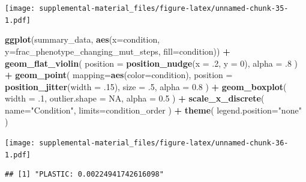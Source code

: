 \documentclass[]{book}
\newenvironment{Shaded}{\begin{snugshade}}{\end{snugshade}}
\newcommand{\DataTypeTok}[1]{\textcolor[rgb]{0.13,0.29,0.53}{#1}}
\newcommand{\DecValTok}[1]{\textcolor[rgb]{0.00,0.00,0.81}{#1}}
\newcommand{\FloatTok}[1]{\textcolor[rgb]{0.00,0.00,0.81}{#1}}
\newcommand{\KeywordTok}[1]{\textcolor[rgb]{0.13,0.29,0.53}{\textbf{#1}}}
\newcommand{\NormalTok}[1]{#1}
\newcommand{\OperatorTok}[1]{\textcolor[rgb]{0.81,0.36,0.00}{\textbf{#1}}}
\newcommand{\OtherTok}[1]{\textcolor[rgb]{0.56,0.35,0.01}{#1}}
\newcommand{\StringTok}[1]{\textcolor[rgb]{0.31,0.60,0.02}{#1}}
\begin{document}
\texttt{[image: supplemental-material\_files/figure-latex/unnamed-chunk-35-1.pdf]}

\begin{Shaded}
\begin{Highlighting}[]
\KeywordTok{ggplot}\NormalTok{(summary_data, }\KeywordTok{aes}\NormalTok{(}\DataTypeTok{x=}\NormalTok{condition, }\DataTypeTok{y=}\NormalTok{frac_phenotype_changing_mut_steps, }\DataTypeTok{fill=}\NormalTok{condition)) }\OperatorTok{+}
\StringTok{  }\KeywordTok{geom_flat_violin}\NormalTok{(}
    \DataTypeTok{position =} \KeywordTok{position_nudge}\NormalTok{(}\DataTypeTok{x =} \FloatTok{.2}\NormalTok{, }\DataTypeTok{y =} \DecValTok{0}\NormalTok{),}
    \DataTypeTok{alpha =} \FloatTok{.8}
\NormalTok{  ) }\OperatorTok{+}
\StringTok{  }\KeywordTok{geom_point}\NormalTok{(}
    \DataTypeTok{mapping=}\KeywordTok{aes}\NormalTok{(}\DataTypeTok{color=}\NormalTok{condition),}
    \DataTypeTok{position =} \KeywordTok{position_jitter}\NormalTok{(}\DataTypeTok{width =} \FloatTok{.15}\NormalTok{),}
    \DataTypeTok{size =} \FloatTok{.5}\NormalTok{,}
    \DataTypeTok{alpha =} \FloatTok{0.8}
\NormalTok{  ) }\OperatorTok{+}
\StringTok{  }\KeywordTok{geom_boxplot}\NormalTok{(}
    \DataTypeTok{width =} \FloatTok{.1}\NormalTok{,}
    \DataTypeTok{outlier.shape =} \OtherTok{NA}\NormalTok{,}
    \DataTypeTok{alpha =} \FloatTok{0.5}
\NormalTok{  ) }\OperatorTok{+}
\StringTok{  }\KeywordTok{scale_x_discrete}\NormalTok{(}
    \DataTypeTok{name=}\StringTok{"Condition"}\NormalTok{,}
    \DataTypeTok{limits=}\NormalTok{condition_order}
\NormalTok{  ) }\OperatorTok{+}
\StringTok{  }\KeywordTok{theme}\NormalTok{(}
    \DataTypeTok{legend.position=}\StringTok{"none"}
\NormalTok{  )}
\end{Highlighting}
\end{Shaded}

\texttt{[image: supplemental-material\_files/figure-latex/unnamed-chunk-36-1.pdf]}

\begin{Shaded}
\end{Shaded}

\begin{verbatim}
## [1] "PLASTIC: 0.00224941742616098"
\end{verbatim}
\end{document}
